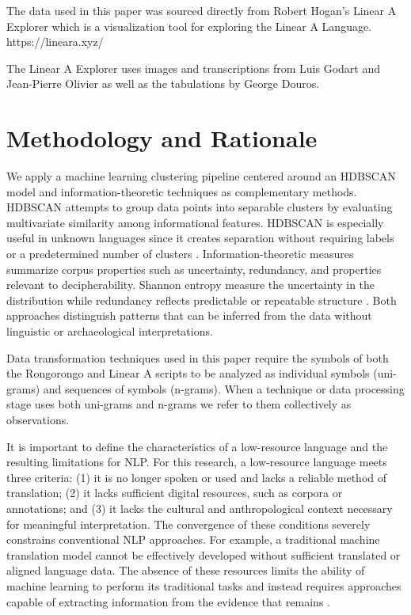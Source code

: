 \documentclass[preprint,12pt]{elsarticle}
\begin{document}
The data used in this paper was sourced directly from Robert Hogan's Linear A Explorer which is a visualization tool for exploring the Linear A Language. \cite{karajgikar2025_linear_a}
https://lineara.xyz/

The Linear A Explorer uses images and transcriptions from Luis Godart and Jean-Pierre Olivier \cite{salgarella2021_sigla} as well as the tabulations by George Douros. \cite{karajgikar2025_linear_a}

\section{Methodology and Rationale}
\label{meth}
We apply a machine learning clustering pipeline centered around an HDBSCAN model and information-theoretic techniques as complementary methods. HDBSCAN attempts to group data points into separable clusters by evaluating multivariate similarity among informational features. HDBSCAN is especially useful in unknown languages since it creates separation without requiring labels or a predetermined number of clusters \cite{campello2015_hierarchical_density_estimates}. Information-theoretic measures summarize corpus properties such as uncertainty, redundancy, and properties relevant to decipherability. Shannon entropy measure the uncertainty in the distribution while redundancy reflects predictable or repeatable structure \cite{shannon1945_mathematical_cryptography}. Both approaches distinguish patterns that can be inferred from the data without linguistic or archaeological interpretations. 

Data transformation techniques used in this paper require the symbols of both the Rongorongo and Linear A scripts to be analyzed as individual symbols (uni-grams) and sequences of symbols (n-grams). When a technique or data processing stage uses both uni-grams and n-grams we refer to them collectively as observations.

It is important to define the characteristics of a low-resource language and the resulting limitations for NLP.  For this research, a low-resource language meets three criteria: (1) it is no longer spoken or used and lacks a reliable method of translation; (2) it lacks sufficient digital resources, such as corpora or annotations; and (3) it lacks the cultural and anthropological context necessary for meaningful interpretation. The convergence of these conditions severely constrains conventional NLP approaches. For example, a traditional machine translation model cannot be effectively developed without sufficient translated or aligned language data. The absence of these resources limits the ability of machine learning to perform its traditional tasks and instead requires approaches capable of extracting information from the evidence that remains \cite{magueresse2020_low_resource_languages}.
\end{document}
